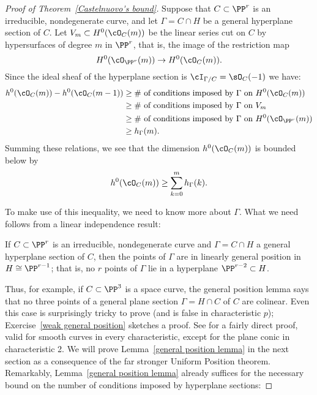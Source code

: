 \begin{proof}[Proof of Theorem~\ref{Castelnuovo's bound}]
Suppose that $C \subset \PP^r$ is an irreducible, nondegenerate curve, and let $\Gamma = C \cap H$ be a general hyperplane section of $C$. Let $V_m \subset H^0(\cO_C(m))$ be the linear series cut on $C$ by hypersurfaces of degree $m$ in $\PP^r$, that is, the image of the restriction map
$$
H^0(\cO_{\PP^r}(m)) \to H^0(\cO_C(m)).
$$
Since the ideal sheaf of the hyperplane section is $\cI_{\Gamma/C} = \sO_C(-1)$ we have:
\begin{align*}
h^0(\cO_C(m)) - h^0(\cO_C(m-1)) & \geq \text{\# of conditions imposed by $\Gamma$ on $H^0(\cO_C(m))$} \\
&\geq \text{\# of conditions imposed by $\Gamma$ on $V_m$} \\
&\geq \text{\# of conditions imposed by $\Gamma$ on $H^0(\cO_{\PP^r}(m))$} \\
&\geq h_\Gamma(m).
\end{align*}
Summing these relations, we see that the dimension $h^0(\cO_C(m))$ is bounded below by
$$
h^0(\cO_C(m)) \geq \sum_{k=0}^m h_\Gamma(k).
$$

 To make use of this inequality, we need to know more about $\Gamma$.
What we need follows from a linear independence result:

\begin{lemma}\label{general position lemma}
If $C \subset \PP^r$ is an irreducible, nondegenerate curve and $\Gamma = C \cap H$ a general hyperplane section of $C$, then the points of $\Gamma$ are in linearly general position in $H \cong \PP^{r-1}$; that is, no $r$ points of $\Gamma$ lie in a hyperplane $\PP^{r-2} \subset H$.
\end{lemma}


Thus, for example, if $C \subset \PP^3$ is a space curve, the general position lemma says that no three points of a general plane section $\Gamma = H \cap C$ of $C$ are colinear. Even this case is surprisingly tricky to prove (and is false in characteristic $p$); Exercise~\ref{weak general position} sketches a proof.
See \cite[Lemma 1.1]{Rathmann} for a fairly direct proof, valid for smooth curves in every characteristic, except for the plane conic in characteristic 2. We will prove Lemma~\ref{general position lemma} in the next section as a consequence of the far stronger Uniform Position theorem. Remarkably, Lemma~\ref{general position lemma} already suffices for the necessary bound on the number of conditions imposed by hyperplane sections:


\end{proof}
